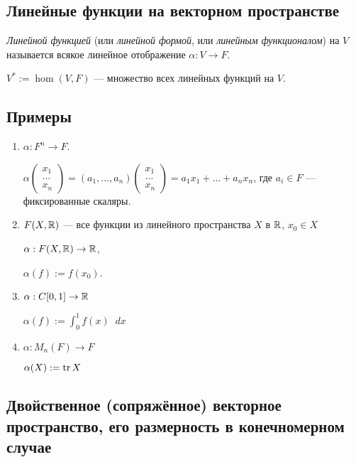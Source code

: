 \subsection{Линейные функции на векторном пространстве}

\begin{definition}
    \textit{Линейной функцией} (или \textit{линейной формой}, или \textit{линейным функционалом}) на $V$ называется всякое линейное отображение $\alpha : V \to F$.
\end{definition}

\begin{designation}
    $V^{*} := \hom(V, F)$ --- множество всех линейных функций на $V$.
\end{designation}


\subsection{Примеры}

\begin{enumerate}
\item $\alpha : F^n \to F$.

    $\alpha \begin{pmatrix} x_1 \\ \dots \\ x_n \end{pmatrix} = (a_1, \dots, a_n) \begin{pmatrix} x_1 \\ \dots \\ x_n \end{pmatrix} = a_1 x_1 + \dots + a_n x_n$, где $a_i \in F$ --- фиксированные скаляры.

\item $F(X, \mathbb{R})$ --- все функции из линейного пространства $X$ в $\mathbb{R}$, $x_0 \in X$

    $\alpha : F(X, \mathbb{R}) \to \mathbb{R}$,

    $\alpha(f) := f(x_0)$.

\item $\alpha : C[0, 1] \to \mathbb{R}$

    $\alpha(f) := \displaystyle\int_0^1 f(x) \mathop{}\!d x$

\item $\alpha : M_n(F) \to F$

    $\alpha(X) := \operatorname{\mathop{\mathrm{tr}}} X$
\end{enumerate}

\subsection{Двойственное (сопряжённое) векторное пространство, его размерность в конечномерном случае}

